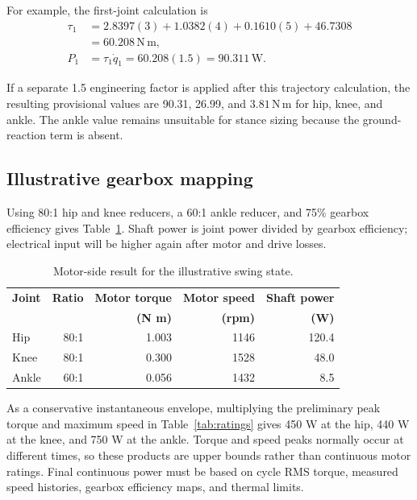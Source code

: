 \documentclass[11pt,a4paper]{article}
\newcommand{\unit}[1]{\ensuremath{\,\mathrm{#1}}}
\newcommand{\Nm}{\unit{N\,m}}
\begin{document}
For example, the first-joint calculation is
\begin{align}
\tau_1 &=
  2.8397(3)+1.0382(4)+0.1610(5)+46.7308 \\
  &=\boxed{60.208\Nm},\\
P_1 &= \tau_1\dot q_1
  =60.208(1.5)=\boxed{90.311\unit{W}}.
\end{align}

If a separate 1.5 engineering factor is applied after this trajectory calculation, the resulting provisional values are 90.31, 26.99, and $3.81\Nm$ for hip, knee, and ankle. The ankle value remains unsuitable for stance sizing because the ground-reaction term is absent.

\subsection{Illustrative gearbox mapping}

Using 80:1 hip and knee reducers, a 60:1 ankle reducer, and 75\% gearbox efficiency gives Table~\ref{tab:motor-map}. Shaft power is joint power divided by gearbox efficiency; electrical input will be higher again after motor and drive losses.

\begin{table}[H]
\centering
\caption{Motor-side result for the illustrative swing state.}
\label{tab:motor-map}
\begin{tabular}{@{}lrrrr@{}}
\toprule
\textbf{Joint} & \textbf{Ratio} & \textbf{Motor torque} & \textbf{Motor speed} & \textbf{Shaft power} \\
& & \textbf{(N m)} & \textbf{(rpm)} & \textbf{(W)} \\
\midrule
Hip & 80:1 & 1.003 & 1146 & 120.4 \\
Knee & 80:1 & 0.300 & 1528 & 48.0 \\
Ankle & 60:1 & 0.056 & 1432 & 8.5 \\
\bottomrule
\end{tabular}
\end{table}

As a conservative instantaneous envelope, multiplying the preliminary peak torque and maximum speed in Table~\ref{tab:ratings} gives 450 W at the hip, 440 W at the knee, and 750 W at the ankle. Torque and speed peaks normally occur at different times, so these products are upper bounds rather than continuous motor ratings. Final continuous power must be based on cycle RMS torque, measured speed histories, gearbox efficiency maps, and thermal limits.
\end{document}

